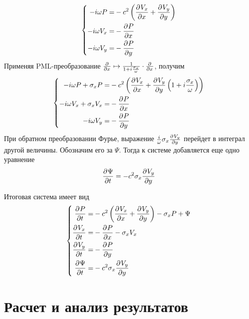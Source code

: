 \documentclass[a4paper, fontsize=14pt]{article}
\begin{document}
\begin{equation}
	\label{pmlsys}
	\left\{
	\begin{aligned}
	    -i\omega P =& -c^2 \left( \diff{V_x}{x} + \diff{V_y}{y} \right)\\
	    -i\omega V_x	=& - \diff{P}{x} \\
          -i\omega V_y =& - \diff{P}{y} 	
    \end{aligned}
	\right.
\end{equation}
Применяя PML-преобразование $\frac{\partial ^ {  } }{\partial x ^ {  } } \mapsto
\frac{1}{1+i\frac{\sigma_x}{\omega}}\cdot\frac{\partial ^ {  } }{\partial x ^ {  } }$, получим 
\begin{equation}
	\label{pmlsystransformed}
	\left\{
	\begin{aligned}
        -i\omega P+\sigma_x P =& -c^2 \left( \diff{V_x}{x} +
		\diff{V_y}{y}\left(1+i\frac{\sigma_x}{\omega}\right) \right)\\
        -i\omega V_x+\sigma_x V_x =& - \diff{P}{x} \\
        -i\omega V_y =&- \diff{P}{y} 
	\end{aligned}
	\right.
\end{equation}
При обратном преобразовании Фурье, выражение $\frac{i}{\omega}\sigma_x \frac{\partial ^ {  } V_y}{\partial y ^ {  } }$ перейдет в
интеграл другой величины. Обозначим его за $\Psi$. Тогда к системе добавляется еще одно уравнение
\begin{equation}
	\frac{\partial ^ {  } \Psi}{\partial t ^ {  } } = -c^2 \sigma_x \frac{\partial ^ {  } V_y}{\partial y ^ {  } }
\end{equation}

	Итоговая система имеет вид
\begin{equation}
	\label{pmlsysfinal}
	\left\{
	\begin{aligned}
		\diff{P}{t} =& -c^2 \left( \diff{V_x}{x} +
		\diff{V_y}{y} \right) -\sigma_x P+\Psi\\
		\diff{V_x}{t} =& - \diff{P}{x} -\sigma_x V_x\\
		\diff{V_y}{t} =& - \diff{P}{y} \\
		\diff{\Psi}{t} =& -c^2 \sigma_x \diff{V_y}{y}
	\end{aligned}
	\right.
\end{equation}
\section{Расчет и анализ результатов}
\end{document}
